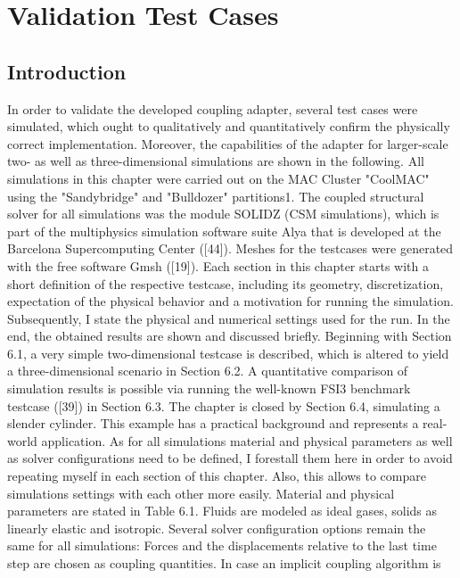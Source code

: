 \chapter{Validation Test Cases}
\label{cha:tests}


\section{Introduction}

In order to validate the developed coupling adapter, several test cases were simulated, which ought to
qualitatively and quantitatively confirm the physically correct implementation. Moreover, the capabilities
of the adapter for larger-scale two- as well as three-dimensional simulations are shown in the following.
All simulations in this chapter were carried out on the MAC Cluster "CoolMAC" using the "Sandybridge"
and "Bulldozer" partitions1. The coupled structural solver for all simulations was the module SOLIDZ
(CSM simulations), which is part of the multiphysics simulation software suite Alya that is developed
at the Barcelona Supercomputing Center ([44]). Meshes for the testcases were generated with the free
software Gmsh ([19]).
Each section in this chapter starts with a short definition of the respective testcase, including its geometry,
discretization, expectation of the physical behavior and a motivation for running the simulation.
Subsequently, I state the physical and numerical settings used for the run. In the end, the obtained
results are shown and discussed briefly.
Beginning with Section 6.1, a very simple two-dimensional testcase is described, which is altered to yield a
three-dimensional scenario in Section 6.2. A quantitative comparison of simulation results is possible via
running the well-known FSI3 benchmark testcase ([39]) in Section 6.3. The chapter is closed by Section
6.4, simulating a slender cylinder. This example has a practical background and represents a real-world
application.
As for all simulations material and physical parameters as well as solver configurations need to be defined,
I forestall them here in order to avoid repeating myself in each section of this chapter. Also, this allows
to compare simulations settings with each other more easily. Material and physical parameters are stated
in Table 6.1. Fluids are modeled as ideal gases, solids as linearly elastic and isotropic.
Several solver configuration options remain the same for all simulations: Forces and the displacements
relative to the last time step are chosen as coupling quantities. In case an implicit coupling algorithm is

